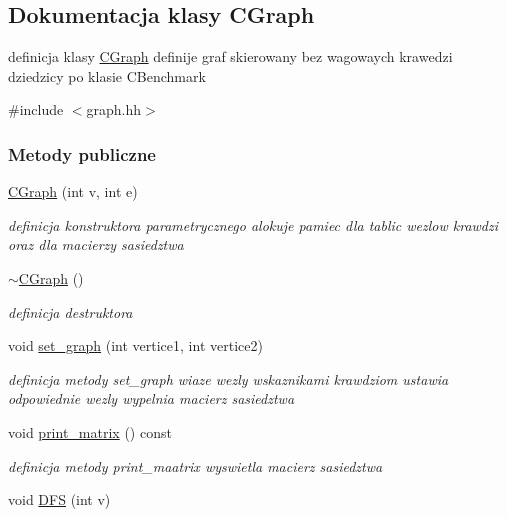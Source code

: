 \hypertarget{class_c_graph}{}\subsection{Dokumentacja klasy C\+Graph}
\label{class_c_graph}


definicja klasy \hyperlink{class_c_graph}{C\+Graph} definije graf skierowany bez wagowaych krawedzi dziedzicy po klasie C\+Benchmark  




{\ttfamily \#include $<$graph.\+hh$>$}

\subsubsection*{Metody publiczne}
\begin{DoxyCompactItemize}
\item 
\hyperlink{class_c_graph_a6568f9df5401061719c6b31111092df2}{C\+Graph} (int v, int e)
\begin{DoxyCompactList}\small\item\em definicja konstruktora parametrycznego alokuje pamiec dla tablic wezlow krawdzi oraz dla macierzy sasiedztwa \end{DoxyCompactList}\item 
\hyperlink{class_c_graph_af939e78d0fef6cea7711ae44f58f5a16}{$\sim$\+C\+Graph} ()
\begin{DoxyCompactList}\small\item\em definicja destruktora \end{DoxyCompactList}\item 
void \hyperlink{class_c_graph_ab400ede6f6abdb683b4f099df1f05edd}{set\+\_\+graph} (int vertice1, int vertice2)
\begin{DoxyCompactList}\small\item\em definicja metody set\+\_\+graph wiaze wezly wskaznikami krawdziom ustawia odpowiednie wezly wypelnia macierz sasiedztwa \end{DoxyCompactList}\item 
void \hyperlink{class_c_graph_a173a387b56acf5035e120f7ec4d144ae}{print\+\_\+matrix} () const 
\begin{DoxyCompactList}\small\item\em definicja metody print\+\_\+maatrix wyswietla macierz sasiedztwa \end{DoxyCompactList}\item 
void \hyperlink{class_c_graph_a995e1f160b774b1d0c73dc1e3d6df5a4}{D\+F\+S} (int v)

\end{DoxyCompactItemize}
